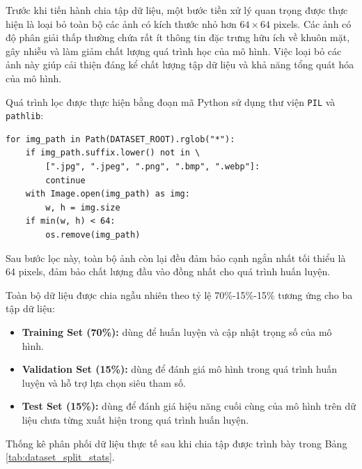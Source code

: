 \documentclass[a4paper,12pt]{article}
\begin{document}
Trước khi tiến hành chia tập dữ liệu, một bước tiền xử lý quan trọng được thực hiện là loại bỏ toàn bộ các ảnh có kích thước nhỏ hơn $64 \times 64$ pixels. Các ảnh có độ phân giải thấp thường chứa rất ít thông tin đặc trưng hữu ích về khuôn mặt, gây nhiễu và làm giảm chất lượng quá trình học của mô hình. Việc loại bỏ các ảnh này giúp cải thiện đáng kể chất lượng tập dữ liệu và khả năng tổng quát hóa của mô hình.
 
Quá trình lọc được thực hiện bằng đoạn mã Python sử dụng thư viện \texttt{PIL} và \texttt{pathlib}:
 
\begin{verbatim}
for img_path in Path(DATASET_ROOT).rglob("*"):
    if img_path.suffix.lower() not in \
        [".jpg", ".jpeg", ".png", ".bmp", ".webp"]:
        continue
    with Image.open(img_path) as img:
        w, h = img.size
    if min(w, h) < 64:
        os.remove(img_path)
\end{verbatim}
 
Sau bước lọc này, toàn bộ ảnh còn lại đều đảm bảo cạnh ngắn nhất tối thiểu là 64 pixels, đảm bảo chất lượng đầu vào đồng nhất cho quá trình huấn luyện.

Toàn bộ dữ liệu được chia ngẫu nhiên theo tỷ lệ 70\%-15\%-15\% tương ứng cho ba tập dữ liệu:

\begin{itemize}
    \item \textbf{Training Set (70\%):} dùng để huấn luyện và cập nhật trọng số của mô hình.
    \item \textbf{Validation Set (15\%):} dùng để đánh giá mô hình trong quá trình huấn luyện và hỗ trợ lựa chọn siêu tham số.
    \item \textbf{Test Set (15\%):} dùng để đánh giá hiệu năng cuối cùng của mô hình trên dữ liệu chưa từng xuất hiện trong quá trình huấn luyện.
\end{itemize}

Thống kê phân phối dữ liệu thực tế sau khi chia tập được trình bày trong Bảng \ref{tab:dataset_split_stats}.
\end{document}
